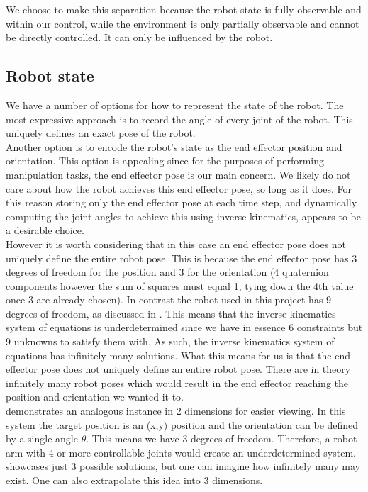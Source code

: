 We choose to make this separation because the robot state is fully observable and within our control, while the environment is only partially observable and cannot be directly controlled. It can only be influenced by the robot.

\subsection{Robot state}
We have a number of options for how to represent the state of the robot. The most expressive approach is to record the angle of every joint of the robot. This uniquely defines an exact pose of the robot.\\

Another option is to encode the robot's state as the end effector position and orientation. This option is appealing since for the purposes of performing manipulation tasks, the end effector pose is our main concern. We likely do not care about how the robot achieves this end effector pose, so long as it does. For this reason storing only the end effector pose at each time step, and dynamically computing the joint angles to achieve this using inverse kinematics, appears to be a desirable choice.\\

However it is worth considering that in this case an end effector pose does not uniquely define the entire robot pose. This is because the end effector pose has 3 degrees of freedom for the position and 3 for the orientation (4 quaternion components however the sum of squares must equal 1, tying down the 4th value once 3 are already chosen). In contrast the robot used in this project has 9 degrees of freedom, as discussed in . This means that the inverse kinematics system of equations is underdetermined since we have in essence 6 constraints but 9 unknowns to satisfy them with. As such, the inverse kinematics system of equations has infinitely many solutions. What this means for us is that the end effector pose does not uniquely define an entire robot pose. There are in theory infinitely many robot poses which would result in the end effector reaching the position and orientation we wanted it to.\\

 demonstrates an analogous instance in 2 dimensions for easier viewing. In this system the target position is an (x,y) position and the orientation can be defined by a single angle $\theta$. This means we have 3 degrees of freedom. Therefore, a robot arm with 4 or more controllable joints would create an underdetermined system.  showcases just 3 possible solutions, but one can imagine how infinitely many may exist. One can also extrapolate this idea into 3 dimensions.

